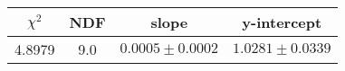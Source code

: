 \begin{tabular}{|c|c|c|c|}

\hline
$\chi^{2}$ & NDF & slope & y-intercept  \\
\hline
4.8979 & 9.0 & $0.0005\pm0.0002$ & $1.0281\pm0.0339$ \\
\hline

\end{tabular}